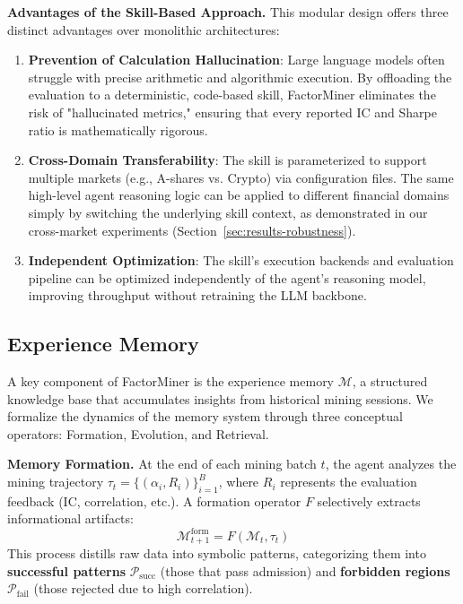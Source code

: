 \documentclass[sigconf]{acmart}
\begin{document}
\textbf{Advantages of the Skill-Based Approach.}
This modular design offers three distinct advantages over monolithic architectures:
\begin{enumerate}
    \item \textbf{Prevention of Calculation Hallucination}: Large language models often struggle with precise arithmetic and algorithmic execution. By offloading the evaluation to a deterministic, code-based skill, FactorMiner eliminates the risk of "hallucinated metrics," ensuring that every reported IC and Sharpe ratio is mathematically rigorous.
    \item \textbf{Cross-Domain Transferability}: The skill is parameterized to support multiple markets (e.g., A-shares vs. Crypto) via configuration files. The same high-level agent reasoning logic can be applied to different financial domains simply by switching the underlying skill context, as demonstrated in our cross-market experiments (Section~\ref{sec:results-robustness}).
    \item \textbf{Independent Optimization}: The skill's execution backends and evaluation pipeline can be optimized independently of the agent's reasoning model, improving throughput without retraining the LLM backbone.
\end{enumerate}

\subsection{Experience Memory}
\label{sec:memory}
\label{app:memory}

A key component of FactorMiner is the experience memory $\mathcal{M}$, a structured knowledge base that accumulates insights from historical mining sessions. 
We formalize the dynamics of the memory system through three conceptual operators: Formation, Evolution, and Retrieval.

\textbf{Memory Formation.}
At the end of each mining batch $t$, the agent analyzes the mining trajectory $\tau_t = \{(\alpha_i, R_i)\}_{i=1}^B$, where $R_i$ represents the evaluation feedback (IC, correlation, etc.). A formation operator $F$ selectively extracts informational artifacts:
\begin{equation}
\mathcal{M}_{t+1}^{\text{form}} = F(\mathcal{M}_t, \tau_t)
\end{equation}
This process distills raw data into symbolic patterns, categorizing them into \textbf{successful patterns} $\mathcal{P}_{\text{succ}}$ (those that pass admission) and \textbf{forbidden regions} $\mathcal{P}_{\text{fail}}$ (those rejected due to high correlation).
\end{document}
